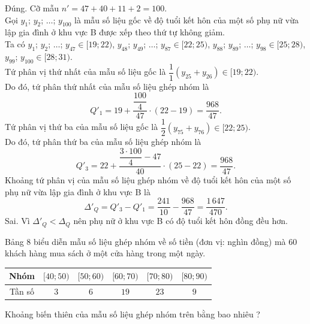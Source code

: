 \begin{ex}
{\begin{itemchoice}
\itemch Đúng. Cỡ mẫu $n'=47+40+11+2=100$.\\
Gọi $y_1$; $y_2$; $\ldots$; $y_{100}$ là mẫu số liệu gốc về độ tuổi kết hôn của một số phụ nữ vừa lập gia đình ở khu vực B được xếp theo thứ tự không giảm.\\
Ta có $y_1$; $y_2$; $\ldots$; $y_{47} \in [19; 22)$, $y_{48}$; $y_{49}$; $\ldots$; $y_{87} \in [22; 25)$, $y_{88}$; $y_{89}$; $\ldots$; $y_{98} \in [25; 28)$, $y_{99}$; $y_{100} \in [28; 31)$.\\
Tứ phân vị thứ nhất của mẫu số liệu gốc là $\dfrac{1}{1}(y_{25}+y_{26}) \in [19; 22)$.\\
Do đó, tứ phân thứ nhất của mẫu số liệu ghép nhóm là $$Q'_1 = 19 + \dfrac{\dfrac{100}{4}}{47}\cdot (22-19)=\dfrac{968}{47}.$$
Tứ phân vị thứ ba của mẫu số liệu gốc là $\dfrac{1}{2}(y_{75}+y_{76})\in[22; 25)$.\\
Do đó, tứ phân thứ ba của mẫu số liệu ghép nhóm là $$Q'_3=22+\dfrac{\dfrac{3\cdot100}{4}-47}{40}\cdot (25-22)=\dfrac{968}{47}.$$
Khoảng tứ phân vị của mẫu số liệu ghép nhóm về độ tuổi kết hôn của một số phụ nữ vừa lập gia đình ở khu vực B là $$\Delta'_Q = Q'_3-Q'_1=\dfrac{241}{10}-\dfrac{968}{47}=\dfrac{1\,647}{470}.$$
\itemch Sai. Vì $\Delta'_Q < \Delta_Q$ nên phụ nữ ở khu vực B có độ tuổi kết hôn đồng đều hơn.
\end{itemchoice}
}
\end{ex}

\begin{ex}%
	Bảng $8$ biểu diễn mẫu số liệu ghép nhóm về số tiền (đơn vị: nghìn đồng) mà $60$ khách hàng mua sách ở một cửa hàng trong một ngày.
	\begin{center}
		\begin{tabular}{|c|c|c|c|c|c|}
	\hline Nhóm  &$[40 ; 50)$ & {$[50 ; 60)$} & {$[60 ; 70)$} &	{$[70 ; 80)$} &	{$[80 ; 90)$} \\
	\hline Tần số & $3$ & $6$ & $19$ & $23$ &$9$\\
	\hline
\end{tabular}
	\end{center}
Khoảng biến thiên của mẫu số liệu ghép nhóm trên bằng bao nhiêu ?
\end{ex}

